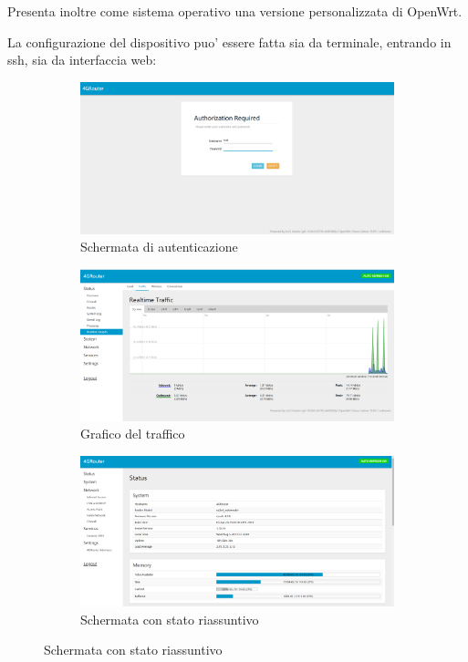 Presenta inoltre come sistema operativo una versione personalizzata di OpenWrt.

La configurazione del dispositivo puo' essere fatta sia da terminale, entrando in ssh, sia da interfaccia web:

\begin{figure}[H]

	\newlength{\tempheight}
	\setlength{\tempheight}{23ex}

	\centering%
	\begin{subfigure}[t]{0.5\textwidth}
		\centering%
		\includegraphics[totalheight=\tempheight]{immagini/interfacciar4g_init}
		\caption{Schermata di autenticazione}
	\end{subfigure}%
	\hfill
	\begin{subfigure}[t]{0.5\textwidth}
		\centering%
		\includegraphics[totalheight=\tempheight]{immagini/interfacciar4g_traffic}
		\caption{Grafico del traffico}
	\end{subfigure}

	\vspace{1ex}

	\begin{subfigure}[b]{\textwidth}
		\centering%
		\includegraphics[totalheight=1.6\tempheight]{immagini/interfacciar4g_status}
		\caption{Schermata con stato riassuntivo}
	\end{subfigure}


\end{figure}

